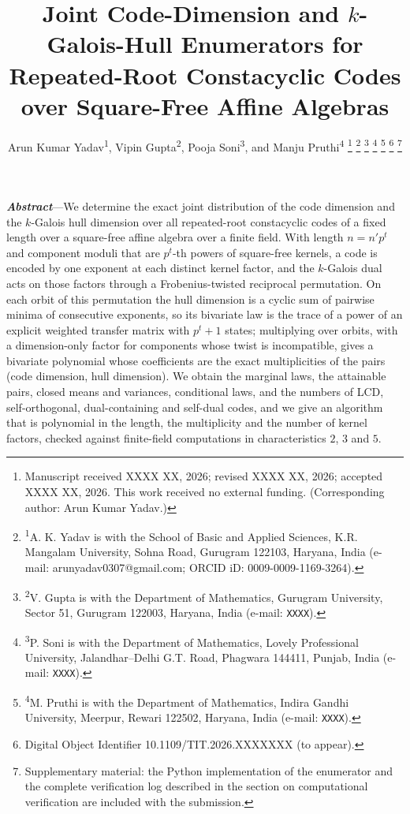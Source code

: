 \documentclass[11pt,a4paper]{article}
\theoremstyle{plain}
\theoremstyle{definition}
\theoremstyle{remark}
\begin{document}
\title{\bfseries Joint Code-Dimension and \texorpdfstring{$k$}{k}-Galois-Hull
Enumerators for Repeated-Root Constacyclic Codes over Square-Free Affine
Algebras}

\author{Arun Kumar Yadav\textsuperscript{1}, Vipin Gupta\textsuperscript{2},
Pooja Soni\textsuperscript{3}, and Manju Pruthi\textsuperscript{4}%
\thanks{Manuscript received XXXX XX, 2026; revised XXXX XX, 2026; accepted
XXXX XX, 2026. This work received no external funding. (Corresponding author:
Arun Kumar Yadav.)}%
\thanks{\textsuperscript{1}A. K. Yadav is with the School of Basic and Applied
Sciences, K.R. Mangalam University, Sohna Road, Gurugram 122103, Haryana, India
(e-mail: arunyadav0307@gmail.com; ORCID iD: 0009-0009-1169-3264).}%
\thanks{\textsuperscript{2}V. Gupta is with the Department of Mathematics,
Gurugram University, Sector 51, Gurugram 122003, Haryana, India
(e-mail: \texttt{XXXX}).}%
\thanks{\textsuperscript{3}P. Soni is with the Department of Mathematics,
Lovely Professional University, Jalandhar--Delhi G.T. Road, Phagwara 144411,
Punjab, India (e-mail: \texttt{XXXX}).}%
\thanks{\textsuperscript{4}M. Pruthi is with the Department of Mathematics,
Indira Gandhi University, Meerpur, Rewari 122502, Haryana, India
(e-mail: \texttt{XXXX}).}%
\thanks{Digital Object Identifier 10.1109/TIT.2026.XXXXXXX (to appear).}%
\thanks{Supplementary material: the Python implementation of the enumerator and
the complete verification log described in the section on computational
verification are included with the submission.}}

\date{}

\maketitle
\thispagestyle{empty}

\vspace{-1.2em}

\noindent\textbf{\textit{Abstract}}---We determine the exact joint distribution
of the code dimension and the $k$-Galois hull dimension over all repeated-root
constacyclic codes of a fixed length over a square-free affine algebra over a
finite field. With length $n=n'p^{t}$ and component moduli that are $p^{t}$-th
powers of square-free kernels, a code is encoded by one exponent at each
distinct kernel factor, and the $k$-Galois dual acts on those factors through a
Frobenius-twisted reciprocal permutation. On each orbit of this permutation the
hull dimension is a cyclic sum of pairwise minima of consecutive exponents, so
its bivariate law is the trace of a power of an explicit weighted transfer
matrix with $p^{t}+1$ states; multiplying over orbits, with a dimension-only
factor for components whose twist is incompatible, gives a bivariate polynomial
whose coefficients are the exact multiplicities of the pairs (code dimension,
hull dimension). We obtain the marginal laws, the attainable pairs, closed
means and variances, conditional laws, and the numbers of LCD,
self-orthogonal, dual-containing and self-dual codes, and we give an algorithm
that is polynomial in the length, the multiplicity and the number of kernel
factors, checked against finite-field computations in characteristics $2$, $3$
and $5$.
\end{document}
